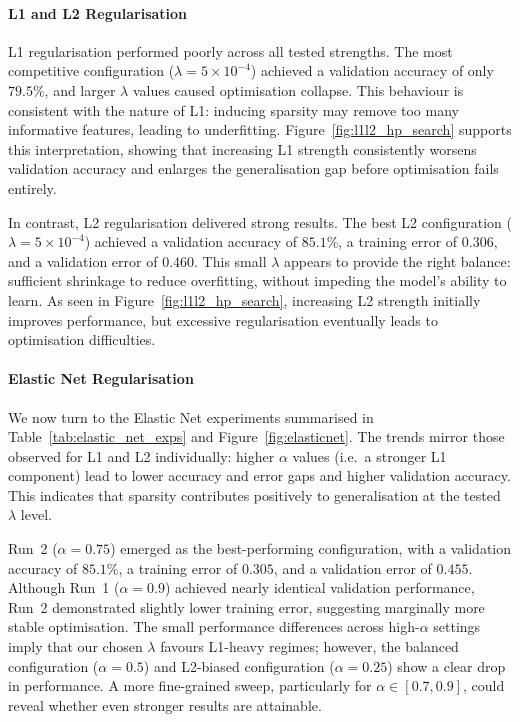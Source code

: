{\paragraph{L1 and L2 Regularisation}
L1 regularisation performed poorly across all tested strengths. The most competitive configuration ($\lambda = 5\times10^{-4}$) 
achieved a validation accuracy of only $79.5\%$, and larger $\lambda$ values caused optimisation collapse. This behaviour is consistent 
with the nature of L1: inducing sparsity may remove too many informative features, leading to underfitting. Figure~\ref{fig:l1l2_hp_search} 
supports this interpretation, showing that increasing L1 strength consistently worsens validation accuracy and enlarges the generalisation 
gap before optimisation fails entirely.

In contrast, L2 regularisation delivered strong results. The best L2 configuration ($\lambda = 5\times10^{-4}$) achieved a 
validation accuracy of $85.1\%$, a training error of $0.306$, and a validation error of $0.460$. This small $\lambda$ appears 
to provide the right balance: sufficient shrinkage to reduce overfitting, without impeding the model's ability to learn. 
As seen in Figure~\ref{fig:l1l2_hp_search}, increasing L2 strength initially improves performance, but excessive regularisation 
eventually leads to optimisation difficulties.

\paragraph{Elastic Net Regularisation}
We now turn to the Elastic Net experiments summarised in Table~\ref{tab:elastic_net_exps} and Figure~\ref{fig:elasticnet}. 
The trends mirror those observed for L1 and L2 individually: higher $\alpha$ values (i.e.\ a stronger L1 component) lead to lower 
accuracy and error gaps and higher validation accuracy. This indicates that sparsity contributes positively to generalisation at the 
tested $\lambda$ level.

Run~2 ($\alpha = 0.75$) emerged as the best-performing configuration, with a validation accuracy of $85.1\%$, a training error of $0.305$, 
and a validation error of $0.455$. Although Run~1 ($\alpha = 0.9$) achieved nearly identical validation performance, Run~2 demonstrated 
slightly lower training error, suggesting marginally more stable optimisation. The small performance differences across high-$\alpha$ 
settings imply that our chosen $\lambda$ favours L1-heavy regimes; however, the balanced configuration ($\alpha = 0.5$) and L2-biased 
configuration ($\alpha = 0.25$) show a clear drop in performance. A more fine-grained sweep, particularly for $\alpha \in [0.7, 0.9]$, 
could reveal whether even stronger results are attainable.

}
